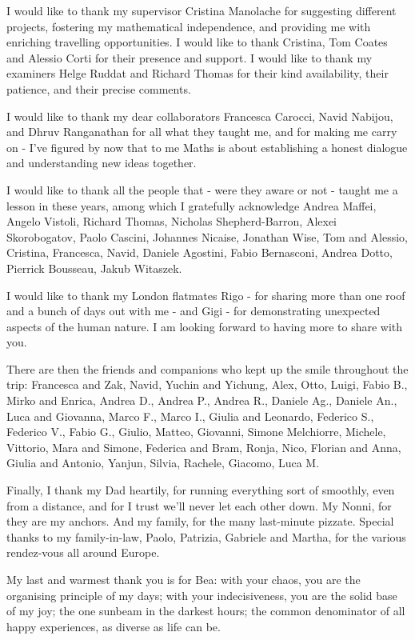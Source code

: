 \documentclass[a4paper,11pt,twoside,final]{book}
\theoremstyle{definition}
\theoremstyle{definition}
\numberwithin{equation}{chapter}    %
\numberwithin{section}{chapter} %
\begin{document}
{\thispagestyle{empty}

\null
\vfill


\medskip

\noindent I would like to thank my supervisor Cristina Manolache for suggesting different projects, fostering my mathematical independence, and providing me with enriching travelling opportunities. I would like to thank Cristina, Tom Coates and Alessio Corti for their presence and support. I would like to thank my examiners Helge Ruddat and Richard Thomas for their kind availability, their patience, and their precise comments.

I would like to thank my dear collaborators Francesca Carocci, Navid Nabijou, and Dhruv Ranganathan for all what they taught me, and for making me carry on - I've figured by now that to me Maths is about establishing a honest dialogue and understanding new ideas together.

I would like to thank all the people that - were they aware or not - taught me a lesson in these years, among which I gratefully acknowledge Andrea Maffei, Angelo Vistoli, Richard Thomas, Nicholas Shepherd-Barron, Alexei Skorobogatov, Paolo Cascini, Johannes Nicaise, Jonathan Wise, Tom and Alessio, Cristina, Francesca, Navid, Daniele Agostini, Fabio Bernasconi, Andrea Dotto, Pierrick Bousseau, Jakub Witaszek.

I would like to thank my London flatmates Rigo - for sharing more than one roof and a bunch of days out with me - and Gigi - for demonstrating unexpected aspects of the human nature. I am looking forward to having more to share with you.

There are then the friends and companions who kept up the smile throughout the trip: Francesca and Zak, Navid, Yuchin and Yichung, Alex, Otto, Luigi, Fabio B., Mirko and Enrica, Andrea D., Andrea P., Andrea R., Daniele Ag., Daniele An., Luca and Giovanna, Marco F., Marco I., Giulia and Leonardo, Federico S., Federico V., Fabio G., Giulio, Matteo, Giovanni, Simone Melchiorre, Michele, Vittorio, Mara and Simone, Federica and Bram, Ronja, Nico, Florian and Anna, Giulia and Antonio, Yanjun, Silvia, Rachele, Giacomo, Luca M.

Finally, I thank my Dad heartily, for running everything sort of smoothly, even from a distance, and for I trust we'll never let each other down. My Nonni, for they are my anchors. And my family, for the many last-minute pizzate. Special thanks to my family-in-law, Paolo, Patrizia, Gabriele and Martha, for the various rendez-vous all around Europe.

My last and warmest thank you is for Bea: with your chaos, you are the organising principle of my days; with your indecisiveness, you are the solid base of my joy; the one sunbeam in the darkest hours; the common denominator of all happy experiences, as diverse as life can be.
\vspace{2cm}
}
%
%
%
\end{document}
